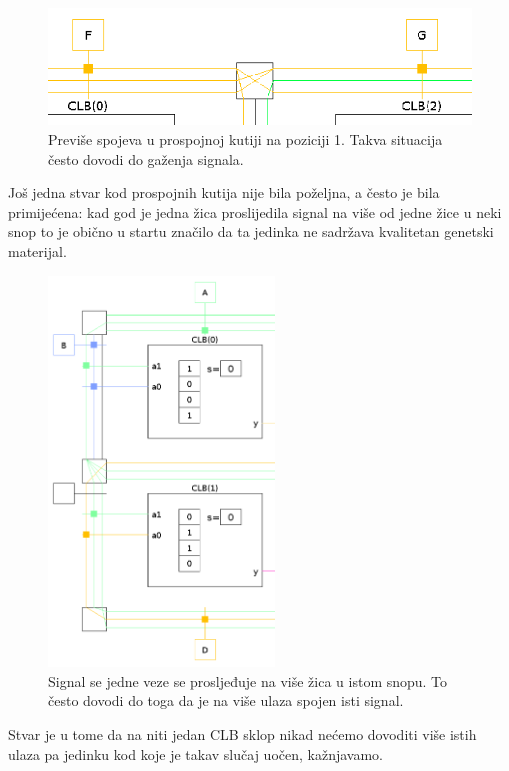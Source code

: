 \documentclass[times, utf8, zavrsni]{fer}
\begin{document}
\begin{figure}[H]
	\centering
	\includegraphics[width=18cm]{slike/isjecakPreviseVeza.png}
	\caption{Previše spojeva u prospojnoj kutiji na poziciji 1. Takva situacija često dovodi do gaženja signala. }
	\label{fig:previse-veza}
\end{figure} 


Još jedna stvar kod prospojnih kutija nije bila poželjna, a često je bila primijećena: kad god je jedna žica proslijedila signal na više od jedne žice u neki snop to je obično u startu značilo da ta jedinka ne sadržava kvalitetan genetski materijal.



\begin{figure}[H]
	\centering
	\includegraphics[width=6cm]{slike/isjecakSusjedneVeze.png}
	\caption{Signal se jedne veze se prosljeđuje na više žica u istom snopu. To često dovodi do toga da je na više ulaza spojen isti signal. }
	\label{fig:susjedne-veze}
\end{figure} 


Stvar je u tome da na niti jedan CLB sklop nikad nećemo dovoditi više istih ulaza pa jedinku kod koje je takav slučaj uočen, kažnjavamo. 
\end{document}
